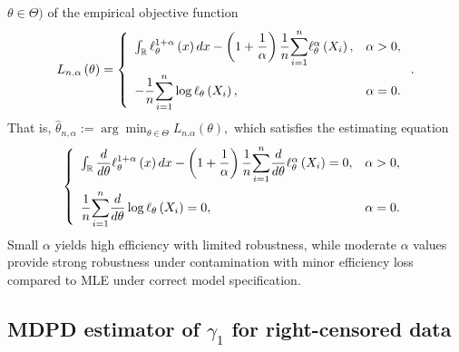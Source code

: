\documentclass[reqno,openbib,runningheads,a4paper,12pt]{amsart}%
\begin{document}
$\theta\in\Theta)$ of the empirical objective function
\[
L_{n.\alpha}\left(  \theta\right)  =\left\{
\begin{array}
[c]{lc}%
\int_{\mathbb{R}}\ell_{\theta}^{1+\alpha}\left(  x\right)  dx-\left(
1+\dfrac{1}{\alpha}\right)  \dfrac{1}{n}%
{\displaystyle\sum\limits_{i=1}^{n}}
\ell_{\theta}^{\alpha}\left(  X_{i}\right)  , & \alpha>0,\medskip\\
-\dfrac{1}{n}%
{\displaystyle\sum\limits_{i=1}^{n}}
\log\ell_{\theta}\left(  X_{i}\right)  , & \alpha=0.
\end{array}
\right.  .
\]
That is, $\widehat{\theta}_{n,\alpha}:=\arg\min_{\theta\in\Theta}L_{n.\alpha
}\left(  \theta\right)  ,$ which satisfies the estimating equation
\[
\left\{
\begin{array}
[c]{lc}%
\int_{\mathbb{R}}\dfrac{d}{d\theta}\ell_{\theta}^{1+\alpha}\left(  x\right)
dx-\left(  1+\dfrac{1}{\alpha}\right)  \dfrac{1}{n}%
{\displaystyle\sum\limits_{i=1}^{n}}
\dfrac{d}{d\theta}\ell_{\theta}^{\alpha}\left(  X_{i}\right)  =0, &
\alpha>0,\medskip\\
\dfrac{1}{n}%
{\displaystyle\sum\limits_{i=1}^{n}}
\dfrac{d}{d\theta}\log\ell_{\theta}\left(  X_{i}\right)  =0, & \alpha=0.
\end{array}
\right.
\]
Small $\alpha$ yields high efficiency with limited robustness, while moderate
$\alpha$ values provide strong robustness under contamination with minor
efficiency loss compared to MLE under correct model specification.

\subsection{MDPD estimator of $\gamma_{1}$ for right-censored data}
\end{document}
